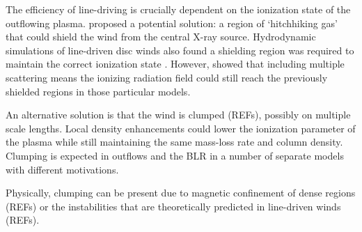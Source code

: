 \documentclass[useAMS,usenatbib]{mn2e_x}
\begin{document}
The efficiency of line-driving is crucially dependent on the ionization state 
of the outflowing plasma. \cite{MCGV95} proposed a potential solution: 
a region of `hitchhiking gas' that could shield the wind from the central X-ray source. 
Hydrodynamic simulations of line-driven disc winds also found a shielding region
was required to maintain the correct ionization state \citep{PSK2000,PK04}. 
However, \cite{H14} showed that including multiple scattering means the ionizing radiation 
field could still reach the previously shielded regions in those particular models.

An alternative solution is that the wind is clumped (REFs), possibly on multiple scale lengths.
Local density enhancements could lower the ionization parameter of the plasma
while still maintaining the same mass-loss rate and column density. 
Clumping is expected in outflows and the BLR in a number of separate models
with different motivations. 

Physically, clumping can be present due to magnetic confinement of 
dense regions (REFs) or the instabilities that are theoretically predicted 
in line-driven winds (REFs). 





\end{document}
